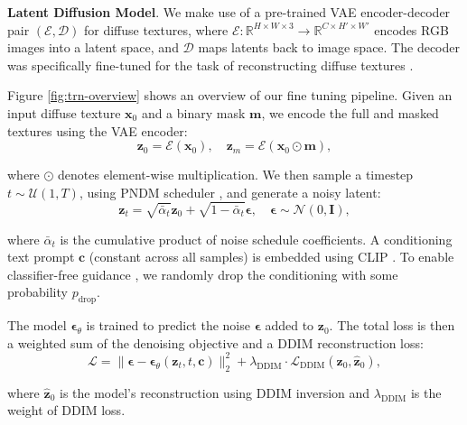 \documentclass[11pt,twocolumn]{article}
\begin{document}
\textbf{Latent Diffusion Model}. We make use of a pre-trained VAE \cite{vae} encoder-decoder pair $(\mathcal{E}, \mathcal{D})$ 
for diffuse textures, where $\mathcal{E}: \mathbb{R}^{H \times W \times 3} \rightarrow \mathbb{R}^{C \times H' \times W'}$ 
encodes RGB images into a latent space, and $\mathcal{D}$ maps latents back to image space. 
The decoder was specifically fine-tuned for the task of reconstructing diffuse textures 
\cite{dresscode}.

Figure \ref{fig:trn-overview} shows an overview of our fine tuning pipeline. Given an input diffuse texture $\mathbf{x}_0$ and a binary mask $\mathbf{m}$, we encode the full and masked textures using the VAE encoder:
\vspace{0.0em}
$$
\mathbf{z}_0 = \mathcal{E}(\mathbf{x}_0), \quad \mathbf{z}_m = \mathcal{E}(\mathbf{x}_0 \odot \mathbf{m}),
$$

where $\odot$ denotes element-wise multiplication. We then sample a timestep $t \sim \mathcal{U}(1, T)$, using PNDM scheduler \cite{pndm}, and generate a noisy latent:
\vspace{0.0em}
$$
\mathbf{z}_t = \sqrt{\bar{\alpha}_t} \mathbf{z}_0 + \sqrt{1 - \bar{\alpha}_t} \boldsymbol{\epsilon}, \quad \boldsymbol{\epsilon} \sim \mathcal{N}(0, \mathbf{I}),
$$

where $\bar{\alpha}_t$ is the cumulative product of noise schedule coefficients. A conditioning text prompt $\mathbf{c}$ (constant across all samples) is embedded using CLIP \cite{clip}. To enable classifier-free guidance \cite{cfg}, we randomly drop the conditioning with some probability $p_{\text{drop}}$.

The model $\boldsymbol{\epsilon}_\theta$ is trained to predict the noise $\boldsymbol{\epsilon}$ added to $\mathbf{z}_0$. The total loss is then a weighted sum of the denoising objective and a DDIM reconstruction loss:
\vspace{0.0em}
$$
\mathcal{L} = \|\boldsymbol{\epsilon} - \boldsymbol{\epsilon}_\theta(\mathbf{z}_t, t, \mathbf{c})\|_2^2 + \lambda_{\text{DDIM}} \cdot \mathcal{L}_{\text{DDIM}}(\mathbf{z}_0, \hat{\mathbf{z}}_0),
$$

where $\hat{\mathbf{z}}_0$ is the model's reconstruction using DDIM inversion \cite{ddim} and $\lambda_{\text{DDIM}}$ is the weight of DDIM loss.
\end{document}
